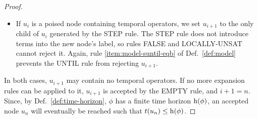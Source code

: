 \documentclass[acmsmall,screen]{acmart}
\begin{document}
\begin{proof}
\begin{itemize}
\item If $u_i$ is a poised node containing temporal operators,
    we set $u_{i+1}$ to the only child of $u_i$ generated by the \textsf{STEP} rule.
    The \textsf{STEP} rule does not introduce terms into the new node's label,
    so rules \textsf{FALSE} and \textsf{LOCALLY-UNSAT} cannot reject it.
    Again, rule \ref{item:model-suntil-eqb} of Def.~\ref{def:model}
    prevents the \textsf{UNTIL} rule from rejecting $u_{i+1}$.
\end{itemize}
In both cases, $u_{i+1}$ may contain no temporal operators.
If no more expansion rules can be applied to it, $u_{i+1}$ is accepted by the \textsf{EMPTY} rule, and $i + 1 = n$.
Since, by Def.~\ref{def:time-horizon}, $\phi$ has a finite time horizon $\operatorname{h}(\phi)$,
an accepted node $u_n$ will eventually be reached such that $t(u_n) \leq \operatorname{h}(\phi)$.
\end{proof}
\end{document}
